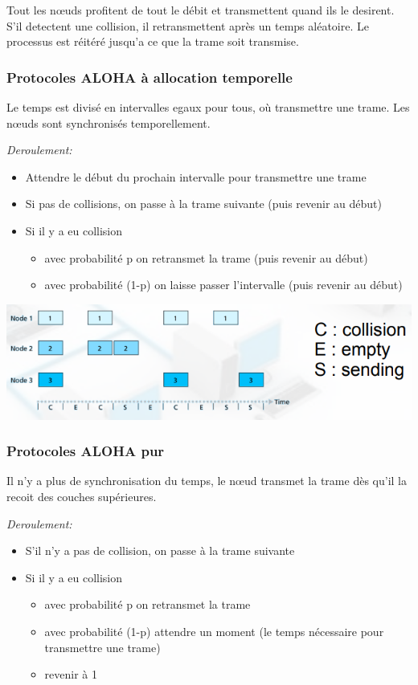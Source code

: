 \documentclass[a4paper, 12pt, french]{article}
\begin{document}
	Tout les nœuds profitent de tout le débit et transmettent quand ils le desirent. S'il detectent une collision, il retransmettent après un temps aléatoire. Le processus est réitéré jusqu'a ce que la trame soit transmise.

	\subsubsection{Protocoles ALOHA à allocation temporelle}

	Le temps est divisé en intervalles egaux pour tous, où transmettre une trame. Les nœuds sont synchronisés temporellement.

	\emph{Deroulement:}
	\begin{itemize}
		\item Attendre le début du prochain intervalle pour transmettre une trame
		\item Si pas de collisions, on passe à la trame suivante (puis revenir au début)
		\item Si il y a eu collision
		\begin{itemize}
			\item avec probabilité p on retransmet la trame (puis revenir au début)
			\item avec probabilité (1-p) on laisse passer l'intervalle (puis revenir au début)
		\end{itemize}
	\end{itemize}

	\includegraphics[width=13.8cm]{reseau_aloha}

	\subsubsection{Protocoles ALOHA pur}

	Il n'y a plus de synchronisation du temps, le nœud transmet la trame dès qu'il la recoit des couches supérieures.

	\emph{Deroulement:}
	\begin{itemize}
		\item S'il n'y a pas de collision, on passe à la trame suivante
		\item Si il y a eu collision
		\begin{itemize}
			\item avec probabilité p on retransmet la trame
			\item avec probabilité (1-p) attendre un moment (le temps nécessaire pour transmettre une trame)
			\item revenir à 1
		\end{itemize}
	\end{itemize}
\end{document}
